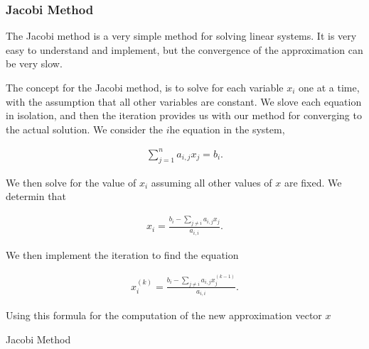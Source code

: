 \documentclass[../fem.tex]{subfiles}
\begin{document}
\subsubsection{Jacobi Method}%
\label{ssub:jacobi_method}

The Jacobi method is a very simple method for solving linear systems. It is
very easy to understand and implement, but the convergence of the approximation
can be very slow.

\begin{Figure}
   \begin{center}
     
   \end{center}
   \label{fig:j_time}
\end{Figure}

The concept for the Jacobi method, is to solve for each variable $x_i$ one at a
time, with the assumption that all other variables are constant. We slove each
equation in isolation, and then the iteration provides us with our method for
converging to the actual solution. We consider the $i$he equation in the
system,

\begin{align*}
  \sum_{j=1}^na_{i,j}x_j=b_i.
\end{align*}

We then solve for the value of $x_i$ assuming all other values of $x$ are
fixed. We determin that

\begin{align*}
  x_i=\frac{b_i-\sum_{j\neq i}a_{i,j}x_j}{a_{i,i}}.
\end{align*}

We then implement the iteration to find the equation

\begin{align*}
  x_i^{(k)}=\frac{b_i-\sum_{j\neq i}a_{i,j}x_j^{(k-1)}}{a_{i,i}}.
\end{align*}

\begin{Figure}
   \begin{center}
     
   \end{center}
   \label{fig:j_err}
\end{Figure}

Using this formula for the computation of the new approximation vector $x$

\begin{algorithm}[H]
  \caption{Jacobi Method}\label{algo:jacobi_method}
  \begin{algorithmic}
    \EndFor
    \EndFor
    \EndIf
    \EndFor
  \end{algorithmic}
\end{algorithm}
\end{document}
